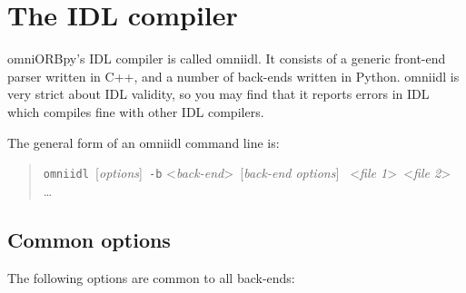 \documentclass[11pt,twoside,a4paper]{book}
\newcommand{\cmdline}[1]{\texttt{#1}}
\begin{document}
\chapter{The IDL compiler}
\label{chap:omniidl}

omniORBpy's IDL compiler is called omniidl. It consists of a generic
front-end parser written in C++, and a number of back-ends written in
Python. omniidl is very strict about IDL validity, so you may find
that it reports errors in IDL which compiles fine with other IDL
compilers.

The general form of an omniidl command line is:

\begin{quote} %
\cmdline{omniidl }[\textit{options}]\cmdline{ -b}%
<\textit{back-end}>\cmdline{ }[\textit{back-end options}]%
\cmdline{ }<\textit{file 1}>\cmdline{ }<\textit{file 2}>%
\cmdline{ }\dots
\end{quote}

\section{Common options}

The following options are common to all back-ends:
\end{document}
